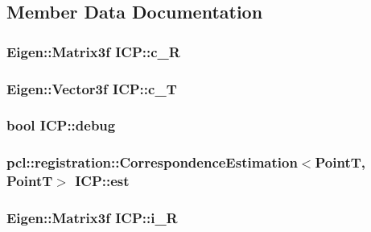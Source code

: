 \subsection{\-Member \-Data \-Documentation}
\hypertarget{classICP_aee085ec283f657cb3980c529d48ba65b}{
\subsubsection[{c\-\_\-\-R}]{\setlength{\rightskip}{0pt plus 5cm}\-Eigen\-::\-Matrix3f {\bf \-I\-C\-P\-::c\-\_\-\-R}}}\label{classICP_aee085ec283f657cb3980c529d48ba65b}
\hypertarget{classICP_a55de298290d8e74617fdf19c153d55be}{
\subsubsection[{c\-\_\-\-T}]{\setlength{\rightskip}{0pt plus 5cm}\-Eigen\-::\-Vector3f {\bf \-I\-C\-P\-::c\-\_\-\-T}}}\label{classICP_a55de298290d8e74617fdf19c153d55be}
\hypertarget{classICP_a6e81d1444353ba66d59cd16d2dc74d7c}{
\subsubsection[{debug}]{\setlength{\rightskip}{0pt plus 5cm}bool {\bf \-I\-C\-P\-::debug}}}\label{classICP_a6e81d1444353ba66d59cd16d2dc74d7c}
\hypertarget{classICP_acf6194ebbf168e4a6059945980752849}{
\subsubsection[{est}]{\setlength{\rightskip}{0pt plus 5cm}pcl\-::registration\-::\-Correspondence\-Estimation$<${\bf \-Point\-T}, {\bf \-Point\-T}$>$ {\bf \-I\-C\-P\-::est}}}\label{classICP_acf6194ebbf168e4a6059945980752849}
\hypertarget{classICP_a07164ef6066cf0c9537881871cd56601}{
\subsubsection[{i\-\_\-\-R}]{\setlength{\rightskip}{0pt plus 5cm}\-Eigen\-::\-Matrix3f {\bf \-I\-C\-P\-::i\-\_\-\-R}}}\label{classICP_a07164ef6066cf0c9537881871cd56601}
